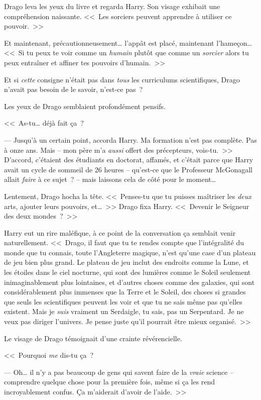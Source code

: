 Drago leva les yeux du livre et regarda Harry. Son visage exhibait une compréhension naissante. <<~Les sorciers peuvent apprendre à utiliser ce pouvoir.~>>

Et maintenant, précautionneusement… l'appât est placé, maintenant l'hameçon… <<~Si tu peux te voir comme un \emph{humain} plutôt que comme un \emph{sorcier} alors tu peux entraîner et affiner tes pouvoirs d'humain.~>>

Et si \emph{cette} consigne n'était pas dans \emph{tous} les curriculums scientifiques, Drago n'avait pas besoin de le savoir, n'est-ce pas~?

Les yeux de Drago semblaient profondément pensifs.

<<~As-tu… déjà fait ça~?

--- Jusqu'à un certain point, accorda Harry. Ma formation n'est pas complète. Pas à onze ans. Mais -- mon père m'a \emph{aussi} offert des précepteurs, vois-tu.~>> D'accord, c'étaient des étudiants en doctorat, affamés, et c'était parce que Harry avait un cycle de sommeil de 26 heures -- qu'est-ce que le Professeur McGonagall allait \emph{faire} à ce sujet~? -- mais laissons cela de côté pour le moment…

Lentement, Drago hocha la tête. <<~Penses-tu que tu puisses maîtriser les \emph{deux} arts, ajouter leurs pouvoirs, et…~>> Drago fixa Harry. <<~Devenir le Seigneur des deux mondes~?~>>

Harry eut un rire maléfique, à ce point de la conversation ça semblait venir naturellement. <<~Drago, il faut que tu te rendes compte que l'intégralité du monde que tu connais, toute l'Angleterre magique, n'est qu'une case d'un plateau de jeu bien plus grand. Le plateau de jeu inclut des endroits comme la Lune, et les étoiles dans le ciel nocturne, qui sont des lumières comme le Soleil seulement inimaginablement plus lointaines, et d'autres choses comme des galaxies, qui sont considérablement plus immenses que la Terre et le Soleil, des choses si grandes que seuls les scientifiques peuvent les voir et que tu ne sais même pas qu'elles existent. Mais je \emph{suis} vraiment un Serdaigle, tu sais, pas un Serpentard. Je ne veux pas diriger l'univers. Je pense juste qu'il pourrait être mieux organisé.~>>

Le visage de Drago témoignait d'une crainte révérencielle.

<<~Pourquoi \emph{me} dis-tu ça~?

--- Oh… il n'y a pas beaucoup de gens qui savent faire de la \emph{vraie} science -- comprendre quelque chose pour la première fois, même si ça les rend incroyablement confus. Ça m'aiderait d'avoir de l'aide.~>>

